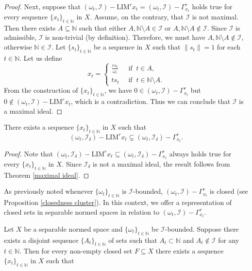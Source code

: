 \documentclass[reqno]{amsart}
\begin{document}
{\begin{proof}
	Next, suppose that $(\omega_t,\mathcal{I})-\text{LIM}^{r} x_t=(\omega_t,\mathcal{I})-\Gamma_{x_t}^r$ holds true for every sequence $\{x_t\}_{t\in\mathbb{N}}$ in $X$. Assume, on the contrary, that $\mathcal{I}$
is not maximal. Then there exists $A\subseteq\mathbb{N}$ such that either $A,\mathbb{N}\setminus A\in\mathcal{I}$ or $A,\mathbb{N}\setminus A\notin\mathcal{I}$. Since $\mathcal{I}$ is admissible, $\mathcal{I}$ is non-trivial (by definition). Therefore, we must have $A,\mathbb{N}\setminus A\notin\mathcal{I}$, otherwise $\mathbb{N}\in\mathcal{I}$.
Let $\{s_t\}_{t\in\mathbb{N}}$ be a sequence in $X$ such that $\|s_t\|=1$ for each $t\in\mathbb{N}$. Let us define
$$x_t=
\begin{cases}
	\frac{rs_t}{\omega_t} &~\mbox{ if }~t\in A,\\
	ts_t &~ \mbox{ if }~t\in\mathbb{N}\setminus A.
\end{cases}$$
From the construction of $\{x_t\}_{t\in\mathbb{N}}$, we have $0\in (\omega_t,\mathcal{I})-\Gamma_{x_t}^r$ but $0\notin (\omega_t,\mathcal{I})-\text{LIM}^{r} x_t$, which is a contradiction. Thus we can conclude that $\mathcal{I}$ is a maximal ideal.
\end{proof}
\begin{corollary}
There exists a sequence $\{x_t\}_{t\in\mathbb{N}}$ in $X$ such that 
$$
(\omega_t,\mathcal{I}_{\delta})-\text{LIM}^{r} x_t\subsetneq(\omega_t,\mathcal{I}_{\delta})-\Gamma_{x_t}^r.
$$
\end{corollary}
\begin{proof}
	Note that 
	$(\omega_t,\mathcal{I}_{\delta})-\text{LIM}^{r} x_t\subseteq(\omega_t,\mathcal{I}_{\delta})-\Gamma_{x_t}^r$ always holds true for every $\{x_t\}_{t\in\mathbb{N}}$ in $X$.
	Since $\mathcal{I}_{\delta}$ is not a maximal ideal, the result follows from Theorem \ref{maximal ideal}.
\end{proof}
As previously noted  whenever $\{\omega_t\}_{t\in\mathbb{N}}$ is $\mathcal{I}$-bounded, $(\omega_t,\mathcal{I})-\Gamma_{x_t}^r$ is closed (see Proposition \ref{closedness cluster}).
In this context, we offer a representation of closed sets in separable normed spaces in relation to $(\omega_t, \mathcal{I})-\Gamma_{x_t}^r$.
\begin{theorem}\label{closed set}
Let $X$ be a separable normed space and $\{\omega_t\}_{t\in\mathbb{N}}$ be $\mathcal{I}$-bounded. Suppose there exists a disjoint sequence $\{A_t\}_{t\in\mathbb{N}}$ of sets such that $A_t\subset\mathbb{N}$ and $A_t\notin\mathcal{I}$ for any $t\in\mathbb{N}$. Then for every non-empty closed set $F\subseteq X$ there exists a sequence $\{x_t\}_{t\in\mathbb{N}}$ in $X$ such that 

\end{theorem}}
\end{document}
